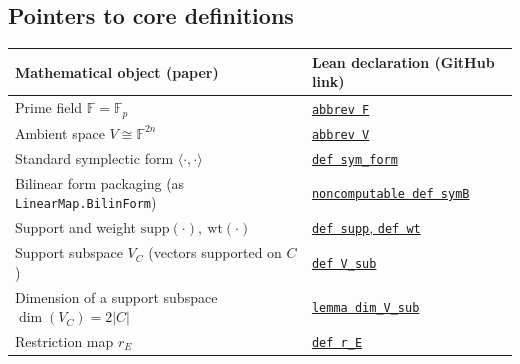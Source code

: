 \documentclass[11pt]{article}
\theoremstyle{plain}
\theoremstyle{definition}
\newcommand{\F}{\mathbb{F}}
\newcommand{\supp}{\mathrm{supp}}
\newcommand{\wt}{\mathrm{wt}}
\begin{document}
\subsection{Pointers to core definitions}
\begin{center}
\renewcommand{\arraystretch}{1.15}
\begin{tabular}{|p{}|p{}|}
\hline
\textbf{Mathematical object (paper)} & \textbf{Lean declaration (GitHub link)}\\
\hline
Prime field $\F=\F_p$ &
\href{https://github.com/Shilun-Allan-Li/tcslib/blob/9c7f65d5b18b64bc56760a2a09dfe6fe3305b8d6/TCSlib/ErrorCorrectingCodes/QuantumSingleton.lean#L72-L74}{\texttt{abbrev F}}\\
\hline
Ambient space $V\cong \F^{2n}$ &
\href{https://github.com/Shilun-Allan-Li/tcslib/blob/9c7f65d5b18b64bc56760a2a09dfe6fe3305b8d6/TCSlib/ErrorCorrectingCodes/QuantumSingleton.lean#L75-L77}{\texttt{abbrev V}}\\
\hline
Standard symplectic form $\langle\cdot,\cdot\rangle$ &
\href{https://github.com/Shilun-Allan-Li/tcslib/blob/9c7f65d5b18b64bc56760a2a09dfe6fe3305b8d6/TCSlib/ErrorCorrectingCodes/QuantumSingleton.lean#L78-L79}{\texttt{def sym\_form}}\\
\hline
Bilinear form packaging (as \texttt{LinearMap.BilinForm}) &
\href{https://github.com/Shilun-Allan-Li/tcslib/blob/9c7f65d5b18b64bc56760a2a09dfe6fe3305b8d6/TCSlib/ErrorCorrectingCodes/QuantumSingleton.lean#L190-L205}{\texttt{noncomputable def symB}}\\
\hline
Support and weight $\supp(\cdot),\ \wt(\cdot)$ &
\href{https://github.com/Shilun-Allan-Li/tcslib/blob/9c7f65d5b18b64bc56760a2a09dfe6fe3305b8d6/TCSlib/ErrorCorrectingCodes/QuantumSingleton.lean#L220-L226}{\texttt{def supp}, \texttt{def wt}}\\
\hline
Support subspace $V_C$ (vectors supported on $C$) &
\href{https://github.com/Shilun-Allan-Li/tcslib/blob/9c7f65d5b18b64bc56760a2a09dfe6fe3305b8d6/TCSlib/ErrorCorrectingCodes/QuantumSingleton.lean#L227-L243}{\texttt{def V\_sub}}\\
\hline
Dimension of a support subspace $\dim(V_C)=2|C|$ &
\href{https://github.com/Shilun-Allan-Li/tcslib/blob/9c7f65d5b18b64bc56760a2a09dfe6fe3305b8d6/TCSlib/ErrorCorrectingCodes/QuantumSingleton.lean#L316-L328}{\texttt{lemma dim\_V\_sub}}\\
\hline
Restriction map $r_E$ &
\href{https://github.com/Shilun-Allan-Li/tcslib/blob/9c7f65d5b18b64bc56760a2a09dfe6fe3305b8d6/TCSlib/ErrorCorrectingCodes/QuantumSingleton.lean#L329-L365}{\texttt{def r\_E}}\\

\end{tabular}
\end{center}
\end{document}
